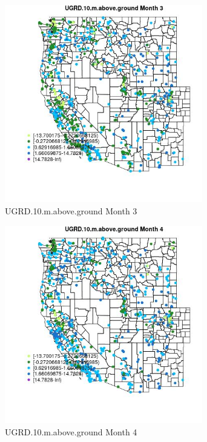 \begin{figure} 
\centering  
\includegraphics[width=0.77\textwidth]{Code_Outputs/Report_ML_input_PM25_Step4_part_e_de_duplicated_aves_compiled_2019-05-21wNAs_MapObsMo3UGRD10maboveground.jpg} 
\caption{\label{fig:Report_ML_input_PM25_Step4_part_e_de_duplicated_aves_compiled_2019-05-21wNAsMapObsMo3UGRD10maboveground}UGRD.10.m.above.ground Month 3} 
\end{figure} 
 

\begin{figure} 
\centering  
\includegraphics[width=0.77\textwidth]{Code_Outputs/Report_ML_input_PM25_Step4_part_e_de_duplicated_aves_compiled_2019-05-21wNAs_MapObsMo4UGRD10maboveground.jpg} 
\caption{\label{fig:Report_ML_input_PM25_Step4_part_e_de_duplicated_aves_compiled_2019-05-21wNAsMapObsMo4UGRD10maboveground}UGRD.10.m.above.ground Month 4} 
\end{figure} 
 


